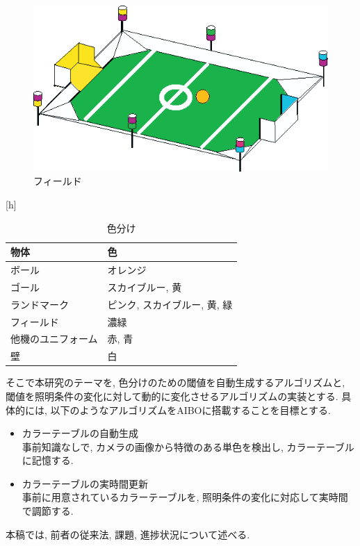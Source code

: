 \documentclass[a4paper,11pt]{jarticle}
\begin{document}
\begin{figure}[h]
	\begin{center}
	\includegraphics[width=0.8\linewidth]{Fig/field.eps}
	\caption{フィールド}
	\label{fig:field}
	\end{center}
\end{figure}[h]
\begin{table}[h]
\begin{center}
\begin{small}
\caption{色分け}\label{tab:collabel}
\begin{tabular}{l|l}
\textbf{物体} & \textbf{色} \\
\hline
ボール	& オレンジ\\
ゴール	& スカイブルー, 黄\\
ランドマーク	& ピンク, スカイブルー, 黄, 緑\\
フィールド	& 濃緑\\
他機のユニフォーム	& 赤, 青\\
壁	& 白
\end{tabular}
\end{small}
\end{center}
\end{table}

そこで本研究のテーマを, 色分けのための閾値を自動生成するアルゴリズムと,
閾値を照明条件の変化に対して動的に変化させるアルゴリズムの実装とする. 
具体的には, 以下のようなアルゴリズムをAIBOに搭載することを目標とする. 


\begin{itemize}
	\item カラーテーブルの自動生成\\
事前知識なしで, カメラの画像から特徴のある単色を検出し,
カラーテーブルに記憶する. 

	\item カラーテーブルの実時間更新\\
事前に用意されているカラーテーブルを,
照明条件の変化に対応して実時間で調節する. 

\end{itemize}
本稿では, 前者の従来法, 課題, 進捗状況について述べる. 
\end{document}
